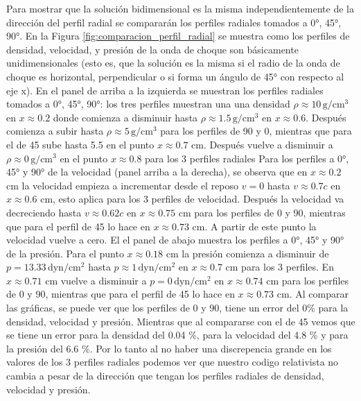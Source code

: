 \documentclass[12pt,a4paper]{book}
\begin{document}
Para mostrar que la solución bidimensional es la misma independientemente de la dirección del perfil
radial se compararán los perfiles radiales tomados a 0°, 45°, 90°. 
{\color{blue}En la Figura \ref{fig:comparacion_perfil_radial} se muestra como los perfiles de densidad, velocidad, y presión de la onda de choque son básicamente unidimensionales 
(esto es, que la solución es la misma si el radio de la onda de choque es horizontal, perpendicular o si forma un ángulo de 45° con respecto al eje x).} 
En el panel de arriba a la izquierda se muestran
los perfiles radiales tomados a 0°, 45°, 90°: los tres perfiles muestran una
una densidad $\rho \approx 10 \, \text{g}/\text{cm}^3$ en $x \approx 0.2$
donde comienza a disminuir hasta $\rho \approx 1.5 \, \text{g}/\text{cm}^3$ en $x \approx 0.6$. Después comienza a subir hasta 
$\rho \approx 5 \, \text{g}/\text{cm}^3$ para los perfiles de 90 y 0, mientras que para el de 45 sube hasta 5.5 en el punto
$x \approx 0.7$ cm. Después vuelve a disminuir a $\rho \approx 0 \, \text{g}/\text{cm}^3$ en el punto $x \approx 0.8$ para los 
3 perfiles radiales
Para los perfiles a 0°, 45° y 90° de la velocidad (panel arriba a la derecha), 
se observa que en $x \approx 0.2$ cm la velocidad empieza a incrementar desde el reposo
$v = 0$ hasta $v \approx 0.7c$ en $x \approx 0.6$ cm, esto aplica para los 3 perfiles de velocidad. 
Después la velocidad
va decreciendo hasta $v \approx 0.62c$ en $x \approx 0.75$ cm para los perfiles de 0 y 90, mientras que para 
el perfil de 45 lo hace en $x \approx 0.73$ cm. A partir de este punto la velocidad vuelve a cero.
El el panel de abajo muestra los perfiles a 0°, 45° y 90° de la presión. 
Para el punto $x \approx 0.18$ cm
la presión comienza a disminuir de $p = 13.33 \,  \text{dyn}/ \text{cm}^2$ 
hasta $p \approx 1 \,  \text{dyn}/ \text{cm}^2$ en $x \approx 0.7$ cm para los 
3 perfiles. En $x \approx 0.71 $ cm vuelve a disminuir a $p = 0 \,  \text{dyn}/ \text{cm}^2$ en 
$x \approx 0.74 $ cm para los perfiles de 
0 y 90, mientras que para el perfil de 45 lo hace en $x \approx 0.73 $ cm.
Al comparar las gráficas, se puede ver que los perfiles de 0 y 90, tiene un error del 0\% 
para la densidad, velocidad y presión. Mientras que
al compararse con el de 45 vemos que se tiene un error para la densidad del 0.04 \%,
para la velocidad del 4.8 \% y para la presión del 6.6 \%.
Por lo tanto al no haber una discrepencia grande en los valores de los 3 perfiles radiales podemos ver
que nuestro codigo relativista no cambia a pesar de la dirección que tengan los perfiles radiales de 
densidad, velocidad y presión.
\end{document}
